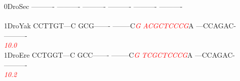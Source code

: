 \documentclass[11pt,twoside,reqno,a4paper]{article}
\begin{document}
{0\hspace*{3\charwidth}DroSec	----------	----------	----------	----------	----------	----------	\\
\hspace*{4\charwidth}\hspace*{7\charwidth}\hspace*{1\charwidth}\hspace*{1\charwidth}\hspace*{1\charwidth}\hspace*{1\charwidth}\hspace*{1\charwidth}\hspace*{1\charwidth}\\
1\hspace*{3\charwidth}DroYak	CCTTGT---C	GCG-------	--------C\textit{\textcolor{red}{G}}	\textit{\textcolor{red}{A}}\textit{\textcolor{red}{C}}\textit{\textcolor{red}{G}}\textit{\textcolor{red}{C}}\textit{\textcolor{red}{T}}\textit{\textcolor{red}{C}}\textit{\textcolor{red}{C}}\textit{\textcolor{red}{C}}\textit{\textcolor{red}{G}}A	---CCAGAC-	----------	\\
\hspace*{4\charwidth}\hspace*{7\charwidth}\hspace*{1\charwidth}\hspace*{1\charwidth}\hspace*{29\charwidth}\textit{\textcolor{red}{10.0}}\hspace*{1\charwidth}\hspace*{1\charwidth}\hspace*{1\charwidth}\hspace*{1\charwidth}\\
1\hspace*{3\charwidth}DroEre	CCTGGT---C	GCC-------	--------C\textit{\textcolor{red}{G}}	\textit{\textcolor{red}{T}}\textit{\textcolor{red}{C}}\textit{\textcolor{red}{G}}\textit{\textcolor{red}{C}}\textit{\textcolor{red}{T}}\textit{\textcolor{red}{C}}\textit{\textcolor{red}{C}}\textit{\textcolor{red}{C}}\textit{\textcolor{red}{G}}A	---CCAGAC-	----------	\\
\hspace*{4\charwidth}\hspace*{7\charwidth}\hspace*{1\charwidth}\hspace*{1\charwidth}\hspace*{29\charwidth}\textit{\textcolor{red}{10.2}}\hspace*{1\charwidth}\hspace*{1\charwidth}\hspace*{1\charwidth}\hspace*{1\charwidth}\\
}
\end{document}
